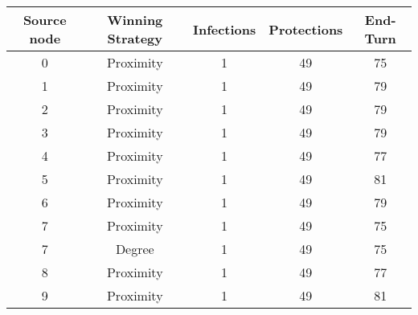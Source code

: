 \documentclass[results.tex]{subfiles}
\begin{document}
    \begin{center}
        \begin{tabular}{| c || c | c | c | c |}
            \hline
            {\bfseries Source node} & {\bfseries Winning Strategy} & {\bfseries Infections} & {\bfseries Protections}
            & {\bfseries End-Turn}
            \\  %
            \hline\hline
            0                       & Proximity                    & 1                      & 49                      & 75                   \\
            \hline
            1                       & Proximity                    & 1                      & 49                      & 79                   \\
            \hline
            2                       & Proximity                    & 1                      & 49                      & 79                   \\
            \hline
            3                       & Proximity                    & 1                      & 49                      & 79                   \\
            \hline
            4                       & Proximity                    & 1                      & 49                      & 77                   \\
            \hline
            5                       & Proximity                    & 1                      & 49                      & 81                   \\
            \hline
            6                       & Proximity                    & 1                      & 49                      & 79                   \\
            \hline
            7                       & Proximity                    & 1                      & 49                      & 75                   \\
            \hline
            7                       & Degree                       & 1                      & 49                      & 75                   \\
            \hline
            8                       & Proximity                    & 1                      & 49                      & 77                   \\
            \hline
            9                       & Proximity                    & 1                      & 49                      & 81                   \\

\end{tabular}
\end{center}
\end{document}
